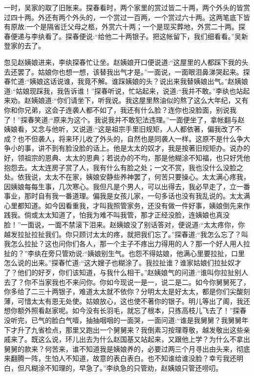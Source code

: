 \begin{parag}
    一时，吴家的取了旧账来。探春看时，两个家里的赏过皆二十两，两个外头的皆赏过四十两。外还有两个外头的，一个赏过一百两，一个赏过六十两。这两笔底下皆有原故:一个是隔省迁父母之柩，外赏六十两；一个是现买葬地，外赏二十两。探春便递与李纨看了。探春便说:“给他二十两银子。把这帐留下，我们细看看。”吴新登家的去了。
\end{parag}


\begin{parag}
    忽见赵姨娘进来，李纨探春忙让坐。赵姨娘开口便说道:“这屋里的人都踩下我的头去还罢了。姑娘你也想一想，该替我出气才是。”一面说，一面眼泪鼻涕哭起来。探春忙道:“姨娘这话说谁，我竟不解。谁踩姨娘的头？说出来我替姨娘出气。”赵姨娘道:“姑娘现踩我，我告诉谁！”探春听说，忙站起来，说道:“我并不敢。”李纨也站起来劝。赵姨娘道:“你们请坐下，听我说。我这屋里熬油似的熬了这么大年纪，又有你和你兄弟，这会子连袭人都不如了，我还有什么脸？连你也没脸面，别说我了！”探春笑道:“原来为这个。我说我并不敢犯法违理。”一面便坐了，拿帐翻与赵姨娘看，又念与他听，又说道:“这是祖宗手里旧规矩，人人都依著，偏我改了不成？也不但袭人，将来环儿收了外头的，自然也是同袭人一样。这原不是什么争大争小的事，讲不到有脸没脸的话上。他是太太的奴才，我是按著旧规矩办。说办的好，领祖宗的恩典、太太的恩典；若说办的不均，那是他糊涂不知福，也只好凭他抱怨去。太太连房子赏了人，我有什么有脸之处；一文不赏，我也没什么没脸之处。依我说，太太不在家，姨娘安静些养神罢了，何苦只要操心。太太满心疼我，因姨娘每每生事，几次寒心。我但凡是个男人，可以出得去，我必早走了，立一番事业，那时自有我一番道理。偏我是女孩儿家，一句多话也没有我乱说的。太太满心里都知道。如今因看重我，才叫我照管家务，还没有做一件好事，姨娘倒先来作践我。倘或太太知道了，怕我为难不叫我管，那才正经没脸，连姨娘也真没脸！”一面说，一面不禁滚下泪来。赵姨娘没了别话答对，便说道:“太太疼你，你越发拉扯拉扯我们。你只顾讨太太的疼，就把我们忘了。”探春道:“我怎么忘了？叫我怎么拉扯？这也问你们各人，那一个主子不疼出力得用的人？那一个好人用人拉扯的？”李纨在旁只管劝说:“姨娘别生气。也怨不得姑娘，他满心里要拉扯，口里怎么说的出来。”探春忙道:“这大嫂子也糊涂了。我拉扯谁？谁家姑娘们拉扯奴才了？他们的好歹，你们该知道，与我什么相干。”赵姨娘气的问道:“谁叫你拉扯别人去了？你不当家我也不来问你。你如今现说一是一，说二是二。如今你舅舅死了，你多给了二三十两银子，难道太太就不依你？分明太太是好太太，都是你们尖酸刻薄，可惜太太有恩无处使。姑娘放心，这也使不著你的银子。明儿等出了阁，我还想你额外照看赵家呢。如今没有长羽毛，就忘了根本，只拣高枝儿飞去了！”探春没听完，已气的脸白气噎，抽抽咽咽的一面哭，一面问道:“谁是我舅舅？我舅舅年下才升了九省检点，那里又跑出一个舅舅来？我倒素习按理尊敬，越发敬出这些亲戚来了。既这么说，环儿出去为什么赵国基又站起来，又跟他上学？为什么不拿出舅舅的款来？何苦来，谁不知道我是姨娘养的，必要过两三个月寻出由头来，彻底来翻腾一阵，生怕人不知道，故意的表白表白。也不知谁给谁没脸？幸亏我还明白，但凡糊涂不知理的，早急了。”李纨急的只管劝，赵姨娘只管还唠叨。
\end{parag}


